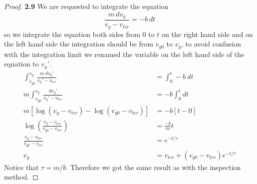 \documentclass[11pt]{article}
\theoremstyle{definition}
\begin{document}
	\begin{proof}{\textbf{2.9}}
        We are requested to integrate the equation
        $$\frac{m~dv_y}{v_y - v_{ter}} = -b~dt$$
        so we integrate the equation both sides from $0$ to $t$ on the
        right hand side and on the left hand side the integration should be
        from $v_{y0}$ to $v_{y}$, to avoid confusion with the integration
        limit we renamed the variable on the left hand side of the equation to
        $v_{y}'$.        
        \begin{align*}
            \int_{v_{y0}}^{v_y} \frac{m~dv_y'}{v_y' - v_{ter}} &= \int_0^t -b~dt \\
            m \int_{v_{y0}}^{v_y} \frac{dv_y'}{v_y' - v_{ter}} &= -b \int_0^t dt \\
            m[\log(v_y - v_{ter}) - \log(v_{y0} - v_{ter})] &= -b[t - 0]\\
            \log(\frac{v_y - v_{ter}}{v_{y0} - v_{ter}}) &= \frac{-b}{m}t\\
            \frac{v_y - v_{ter}}{v_{y0} - v_{ter}} &= e^{-t/\tau}\\
            v_y &= v_{ter} + (v_{y0} - v_{ter})e^{-t/\tau}
        \end{align*}
        Notice that $\tau = m/b$. Therefore we got the same result as with the
        inspection method.
    \end{proof}
\cleardoublepage
\end{document}
